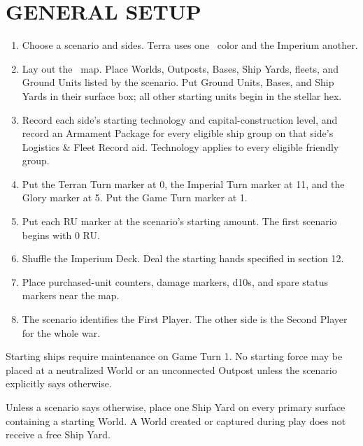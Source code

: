 \section{GENERAL SETUP}

\begin{enumerate}
  \item Choose a scenario and sides. Terra uses one \SpaceEmpires\ color and
    the Imperium another.
  \item Lay out the \Imperium\ map. Place Worlds, Outposts, Bases, Ship Yards,
    fleets, and Ground Units listed by the scenario. Put Ground Units, Bases,
    and Ship Yards in their surface box; all other starting units begin in the
    stellar hex.
  \item Record each side's starting technology and capital-construction level,
    and record an Armament Package for every eligible ship group on that
    side's Logistics \& Fleet Record aid. Technology applies to every eligible
    friendly group.
  \item Put the Terran Turn marker at 0, the Imperial Turn marker at 11, and
    the Glory marker at 5. Put the Game Turn marker at 1.
  \item Put each RU marker at the scenario's starting amount. The first
    scenario begins with 0 RU.
  \item Shuffle the Imperium Deck. Deal the starting hands specified in
    section 12.
  \item Place purchased-unit counters, damage markers, d10s, and spare status
    markers near the map.
  \item The scenario identifies the First Player. The other side is the Second
    Player for the whole war.
\end{enumerate}

Starting ships require maintenance on Game Turn 1. No starting force may be
placed at a neutralized World or an unconnected Outpost unless the scenario
explicitly says otherwise.

Unless a scenario says otherwise, place one Ship Yard on every primary
surface containing a starting World. A World created or captured during play
does not receive a free Ship Yard.
